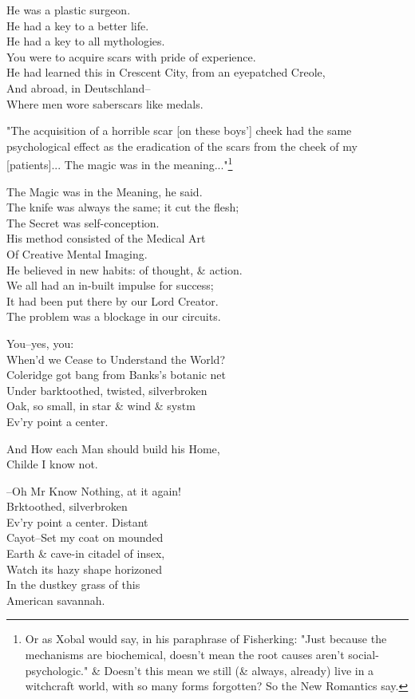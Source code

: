 He was a plastic surgeon. \\
He had a key to a better life. \\
He had a key to all mythologies. \\
You were to acquire scars with pride of experience. \\
He had learned this in Crescent City, from an eyepatched Creole, \\ And abroad, in Deutschland-- \\
Where men wore saberscars like medals.

"The acquisition of a horrible scar [on these boys'] cheek had the same psychological effect as the eradication of the scars from the cheek of my [patients]... The magic was in the meaning..."\footnote{Or as Xobal would say, in his paraphrase of Fisherking: "Just because the mechanisms are biochemical, doesn't mean the root causes aren't social-psychologic." \& Doesn't this mean we still (\& always, already) live in a witchcraft world, with so many forms forgotten? So the New Romantics say.}

The Magic was in the Meaning, he said. \\
The knife was always the same; it cut the flesh; \\
The Secret was self-conception. \\
His method consisted of the Medical Art \\
Of Creative Mental Imaging. \\
He believed in new habits: of thought, \& action. \\
We all had an in-built impulse for success; \\
It had been put there by our Lord Creator. \\
The problem was a blockage in our circuits.

You--yes, you: \\
When'd we Cease to Understand the World? \\
Coleridge got bang from Banks's botanic net \\
Under barktoothed, twisted, silverbroken \\
Oak, so small, in star \& wind \& systm \\
Ev'ry point a center.

And How each Man should build his Home, \\
Childe I know not. 

--Oh Mr Know Nothing, at it again! \\
Brktoothed, silverbroken \\
Ev'ry point a center. Distant \\
Cayot--Set my coat on mounded \\
Earth \& cave-in citadel of insex, \\
Watch its hazy shape horizoned \\
In the dustkey grass of this \\
American savannah.

